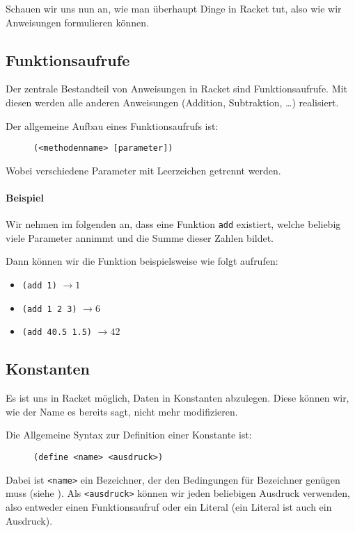 Schauen wir uns nun an, wie man überhaupt Dinge in Racket tut, also wie wir Anweisungen formulieren können.

\subsection{Funktionsaufrufe}
	
	Der zentrale Bestandteil von Anweisungen in Racket sind Funktionsaufrufe. Mit diesen werden alle anderen Anweisungen (Addition, Subtraktion, \dots) realisiert.
	
	Der allgemeine Aufbau eines Funktionsaufrufs ist:
	\begin{figure}[H]
		\centering
		\lstinline[language = Racket]|(<methodenname> [parameter])|
	\end{figure}
	Wobei verschiedene Parameter mit Leerzeichen getrennt werden.
	
	\paragraph{Beispiel}
		Wir nehmen im folgenden an, dass eine Funktion \texttt{add} existiert, welche beliebig viele Parameter annimmt und die Summe dieser Zahlen bildet.
		
		Dann können wir die Funktion beispielsweise wie folgt aufrufen:
		\begin{itemize}
			\item \lstinline[language = Racket]|(add 1)|		\tabto{3cm} \(\rightarrow 1\)
			\item \lstinline[language = Racket]|(add 1 2 3)|    \tabto{3cm} \(\rightarrow 6\)
			\item \lstinline[language = Racket]|(add 40.5 1.5)| \tabto{3cm} \(\rightarrow 42\)
		\end{itemize}

\subsection{Konstanten}
	
	Es ist uns in Racket möglich, Daten in Konstanten abzulegen. Diese können wir, wie der Name es bereits sagt, nicht mehr modifizieren.
	
	Die Allgemeine Syntax zur Definition einer Konstante ist:
	\begin{figure}[H]
		\centering
		\lstinline[language = Racket]|(define <name> <ausdruck>)|
	\end{figure}
	Dabei ist \texttt{<name>} ein Bezeichner, der den Bedingungen für Bezeichner genügen muss (siehe ). Als \texttt{<ausdruck>} können wir jeden beliebigen Ausdruck verwenden, also entweder einen Funktionsaufruf oder ein Literal (ein Literal ist auch ein Ausdruck).
	
